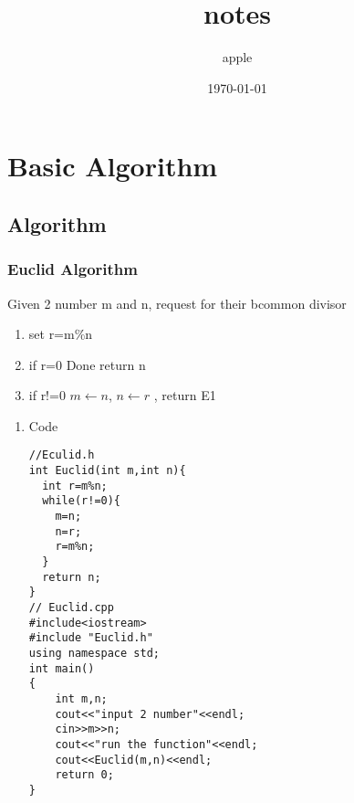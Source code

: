 \documentclass[11pt]{article}
\author{apple}
\date{\today}
\title{notes}
\begin{document}
\maketitle
\tableofcontents

\section{Basic Algorithm}
\label{sec-1}
\subsection{Algorithm}
\label{sec-1-1}
\subsubsection{Euclid Algorithm}
\label{sec-1-1-1}
Given 2 number m and n, request for their bcommon divisor
\begin{enumerate}
\item set r=m\%n
\item if r=0 Done return n
\item if r!=0 $m\leftarrow n$, $n\leftarrow r$ , return E1
\end{enumerate}
\begin{enumerate}
\item Code
\label{sec-1-1-1-1}

\begin{verbatim}
//Eculid.h
int Euclid(int m,int n){
  int r=m%n;
  while(r!=0){
    m=n;
    n=r;
    r=m%n;
  }
  return n;
}
// Euclid.cpp
#include<iostream>
#include "Euclid.h"
using namespace std;
int main()
{
    int m,n;
    cout<<"input 2 number"<<endl;
    cin>>m>>n;
    cout<<"run the function"<<endl;
    cout<<Euclid(m,n)<<endl;
    return 0;
}
\end{verbatim}
\end{enumerate}
\end{document}

